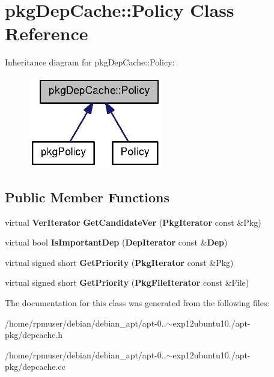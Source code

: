 \section{pkg\-Dep\-Cache\-:\-:\-Policy \-Class \-Reference}
\label{classpkgDepCache_1_1Policy}


\-Inheritance diagram for pkg\-Dep\-Cache\-:\-:\-Policy\-:
\nopagebreak
\begin{figure}[H]
\begin{center}
\leavevmode
\includegraphics[width=166pt]{classpkgDepCache_1_1Policy__inherit__graph}
\end{center}
\end{figure}
\subsection*{\-Public \-Member \-Functions}
\begin{DoxyCompactItemize}
\item 
virtual {\bf \-Ver\-Iterator} {\bfseries \-Get\-Candidate\-Ver} ({\bf \-Pkg\-Iterator} const \&\-Pkg)\label{classpkgDepCache_1_1Policy_a98078e7bb160c136f3b4fb1bd5fde36e}

\item 
virtual bool {\bfseries \-Is\-Important\-Dep} ({\bf \-Dep\-Iterator} const \&{\bf \-Dep})\label{classpkgDepCache_1_1Policy_abec8ff6462cd8e729dcadf1014871d84}

\item 
virtual signed short {\bfseries \-Get\-Priority} ({\bf \-Pkg\-Iterator} const \&\-Pkg)\label{classpkgDepCache_1_1Policy_a12b8f4631ff7d03fbc474a0764b95f06}

\item 
virtual signed short {\bfseries \-Get\-Priority} ({\bf \-Pkg\-File\-Iterator} const \&\-File)\label{classpkgDepCache_1_1Policy_a2b1c46b074def06ea63fedc78a268cf8}

\end{DoxyCompactItemize}


\-The documentation for this class was generated from the following files\-:\begin{DoxyCompactItemize}
\item 
/home/rpmuser/debian/debian\-\_\-apt/apt-\/0..$\sim$exp12ubuntu10./apt-\/pkg/depcache.\-h\item 
/home/rpmuser/debian/debian\-\_\-apt/apt-\/0..$\sim$exp12ubuntu10./apt-\/pkg/depcache.\-cc\end{DoxyCompactItemize}
